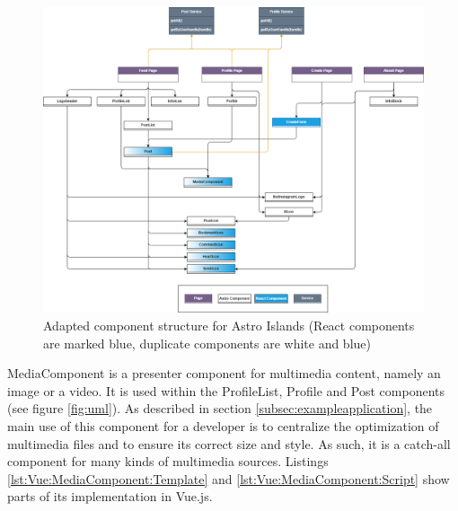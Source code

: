\documentclass[a4paper, 12pt]{article}
\begin{document}
\begin{figure}[h!]
  \begin{center}
    \includegraphics[width=\linewidth]{diagrams/uml-astro.png}
  \end{center}
  \caption{Adapted component structure for Astro Islands (React components are marked blue, duplicate components are white and blue)}\label{fig:astroUml}
\end{figure}

MediaComponent is a presenter component for multimedia content, namely an image or a video.
It is used within the ProfileList, Profile and Post components (see figure \ref{fig:uml}).
As described in section \ref{subsec:exampleapplication}, the main use of this component for a developer is to centralize the optimization of multimedia files and to ensure its correct size and style.
As such, it is a catch-all component for many kinds of multimedia sources. Listings \ref{lst:Vue:MediaComponent:Template} and \ref{lst:Vue:MediaComponent:Script} show parts of its implementation in Vue.js.
\end{document}
